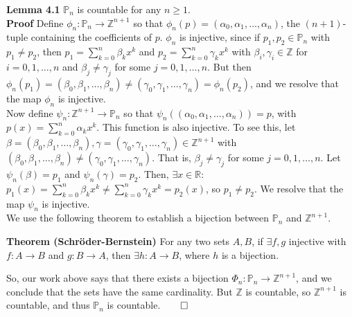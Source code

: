 \documentclass[11pt, letterpaper]{article}
\newcommand{\mbb}[1]{\mathbb{#1}}
\begin{document}
    \begin{center}
        \begin{minipage}[c]{0.85\linewidth}
            {\bf Lemma 4.1} $\mbb{P}_n$ is countable for any $n\geq 1$.\\[10pt]
            {\bf Proof} Define $\phi_n:\mbb{P}_n\rightarrow\mbb{Z}^{n+1}$ so that $\phi_n(p)=(\alpha_0,\alpha_1,\dots,\alpha_n)$, the $(n+1)$-tuple containing the coefficients of $p$. $\phi_n$ is injective, since if $p_1,p_2\in\mbb{P}_n$ with $p_1\neq p_2$, then
            $p_1=\sum_{k=0}^n\beta_kx^k$ and $p_2=\sum_{k=0}^n\gamma_kx^k$ with $\beta_i,\gamma_i\in\mbb{Z}$ for $i=0,1,\dots,n$ and $\beta_j\neq\gamma_j$ for some $j=0,1,\dots,n$. But then $\phi_n(p_1)=(\beta_0,\beta_1,\dots,\beta_n)\neq(\gamma_0,\gamma_1,\dots,\gamma_n)=\phi_n(p_2)$,
            and we resolve that the map $\phi_n$ is injective.\\[10pt]
            Now define $\psi_n:\mbb{Z}^{n+1}\rightarrow \mbb{P}_n$ so that $\psi_n((\alpha_0,\alpha_1,\dots,\alpha_n))=p$, with $p(x)=\sum_{k=0}^n\alpha_kx^k$. This function is also injective. To see this, let $\beta=(\beta_0,\beta_1,\dots,\beta_n),\gamma=(\gamma_0,\gamma_1,\dots,\gamma_n)\in\mbb{Z}^{n+1}$ with $(\beta_0,\beta_1,\dots,\beta_n)\neq(\gamma_0,\gamma_1,\dots,\gamma_n)$. That is,
            $\beta_j\neq\gamma_j$ for some $j=0,1,\dots,n$. Let $\psi_n(\beta)=p_1$ and $\psi_n(\gamma)=p_2$. Then, $\exists x\in\mbb{R}:$ $p_1(x)=\sum_{k=0}^n\beta_kx^k\neq\sum_{k=0}^n\gamma_kx^k=p_2(x)$, so $p_1\neq p_2$. We resolve that the map $\psi_n$ is injective.\\[10pt]
            We use the following theorem to establish a bijection between $\mbb{P}_n$ and $\mbb{Z}^{n+1}$.
            \begin{center}
                \begin{minipage}[c]{0.85\linewidth}
                    {\bf Theorem (Schr\"oder-Bernstein)} For any two sets $A,B$, if $\exists f,g$ injective with $f:A\rightarrow B$ and $g:B\rightarrow A$, then $\exists h:A\rightarrow B$, where $h$ is a bijection.
                \end{minipage}
            \end{center}\vspace{10pt}
            So, our work above says that there exists a bijection $\Phi_n:\mbb{P}_n\rightarrow\mbb{Z}^{n+1}$, and we conclude that the sets have the same cardinality. But $\mbb{Z}$ is countable, so $\mbb{Z}^{n+1}$ is countable, and thus $\mbb{P}_n$ is countable.\hfill{$\qed$}
        \end{minipage}
    \end{center}\vspace{10pt}
\end{document}

